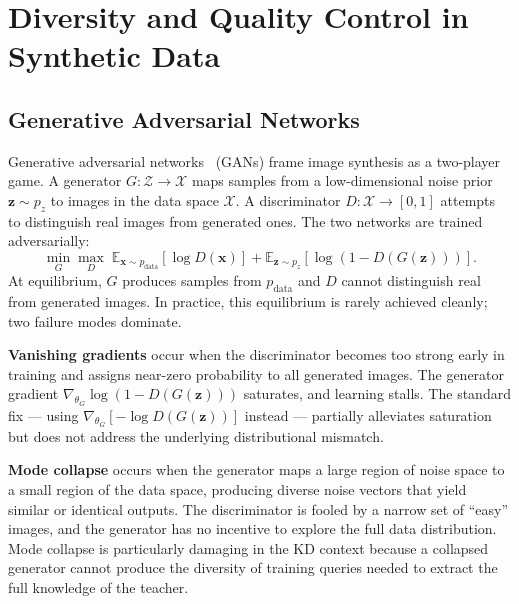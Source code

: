 \section{Diversity and Quality Control in Synthetic Data} \label{sec:25-background-synthetic}

\subsection{Generative Adversarial Networks}
\label{sec:25-background-synthetic-gans}

\begin{foldable}
  Generative adversarial networks~\cite{goodfellow2014generative} (GANs) frame image synthesis as a two-player game.
  A generator $G: \mathcal{Z} \rightarrow \mathcal{X}$ maps samples from a low-dimensional noise prior $\mathbf{z} \sim p_z$ to images in the data space $\mathcal{X}$.
  A discriminator $D: \mathcal{X} \rightarrow [0,1]$ attempts to distinguish real images from generated ones.
  The two networks are trained adversarially:
  \begin{equation}
    \min_{G} \max_{D} \; \mathbb{E}_{\mathbf{x} \sim p_{\text{data}}}[\log D(\mathbf{x})]
    + \mathbb{E}_{\mathbf{z} \sim p_z}[\log(1 - D(G(\mathbf{z})))].
    \label{eq:gan-minimax}
  \end{equation}
  At equilibrium, $G$ produces samples from $p_{\text{data}}$ and $D$ cannot distinguish real from generated images.
  In practice, this equilibrium is rarely achieved cleanly; two failure modes dominate.
\end{foldable}

\begin{foldable}
  \textbf{Vanishing gradients} occur when the discriminator becomes too strong early in training and assigns near-zero probability to all generated images.
  The generator gradient $\nabla_{\theta_G} \log(1 - D(G(\mathbf{z})))$ saturates, and learning stalls.
  The standard fix --- using $\nabla_{\theta_G} [-\log D(G(\mathbf{z}))]$ instead --- partially alleviates saturation but does not address the underlying distributional mismatch.
\end{foldable}

\begin{foldable}
  \textbf{Mode collapse} occurs when the generator maps a large region of noise space to a small region of the data space, producing diverse noise vectors that yield similar or identical outputs.
  The discriminator is fooled by a narrow set of ``easy'' images, and the generator has no incentive to explore the full data distribution.
  Mode collapse is particularly damaging in the KD context because a collapsed generator cannot produce the diversity of training queries needed to extract the full knowledge of the teacher.
\end{foldable}

